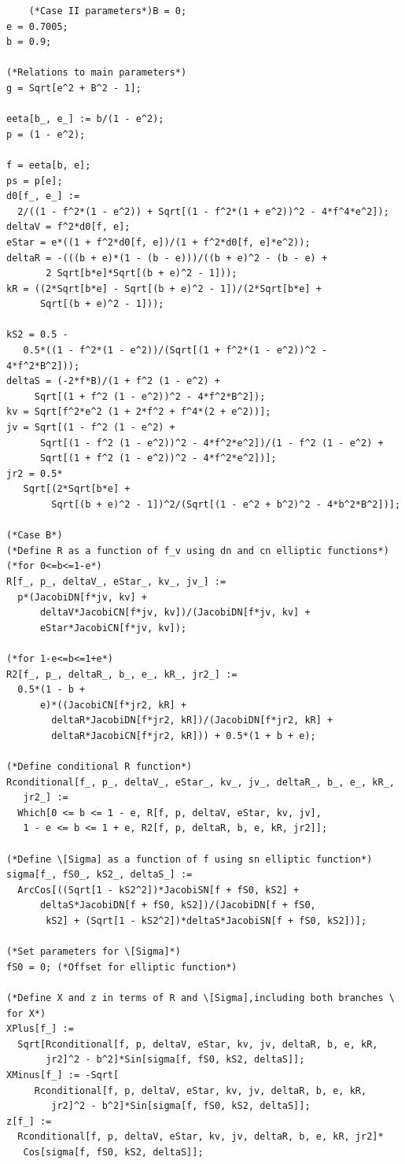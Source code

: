\documentclass[12pt,oneside]{report}
\theoremstyle{definition}
\begin{document}
\begin{verbatim}
    (*Case II parameters*)B = 0;
e = 0.7005;
b = 0.9;

(*Relations to main parameters*)
g = Sqrt[e^2 + B^2 - 1];

eeta[b_, e_] := b/(1 - e^2);
p = (1 - e^2);

f = eeta[b, e];
ps = p[e];
d0[f_, e_] := 
  2/((1 - f^2*(1 - e^2)) + Sqrt[(1 - f^2*(1 + e^2))^2 - 4*f^4*e^2]);
deltaV = f^2*d0[f, e];
eStar = e*((1 + f^2*d0[f, e])/(1 + f^2*d0[f, e]*e^2));
deltaR = -(((b + e)*(1 - (b - e)))/((b + e)^2 - (b - e) + 
       2 Sqrt[b*e]*Sqrt[(b + e)^2 - 1]));
kR = ((2*Sqrt[b*e] - Sqrt[(b + e)^2 - 1])/(2*Sqrt[b*e] + 
      Sqrt[(b + e)^2 - 1]));

kS2 = 0.5 - 
   0.5*((1 - f^2*(1 - e^2))/(Sqrt[(1 + f^2*(1 - e^2))^2 - 4*f^2*B^2]));
deltaS = (-2*f*B)/(1 + f^2 (1 - e^2) + 
     Sqrt[(1 + f^2 (1 - e^2))^2 - 4*f^2*B^2]);
kv = Sqrt[f^2*e^2 (1 + 2*f^2 + f^4*(2 + e^2))];
jv = Sqrt[(1 - f^2 (1 - e^2) + 
      Sqrt[(1 - f^2 (1 - e^2))^2 - 4*f^2*e^2])/(1 - f^2 (1 - e^2) + 
      Sqrt[(1 + f^2 (1 - e^2))^2 - 4*f^2*e^2])];
jr2 = 0.5*
   Sqrt[(2*Sqrt[b*e] + 
        Sqrt[(b + e)^2 - 1])^2/(Sqrt[(1 - e^2 + b^2)^2 - 4*b^2*B^2])];

(*Case B*)
(*Define R as a function of f_v using dn and cn elliptic functions*)
(*for 0<=b<=1-e*)
R[f_, p_, deltaV_, eStar_, kv_, jv_] := 
  p*(JacobiDN[f*jv, kv] + 
      deltaV*JacobiCN[f*jv, kv])/(JacobiDN[f*jv, kv] + 
      eStar*JacobiCN[f*jv, kv]);

(*for 1-e<=b<=1+e*)
R2[f_, p_, deltaR_, b_, e_, kR_, jr2_] := 
  0.5*(1 - b + 
      e)*((JacobiCN[f*jr2, kR] + 
        deltaR*JacobiDN[f*jr2, kR])/(JacobiDN[f*jr2, kR] + 
        deltaR*JacobiCN[f*jr2, kR])) + 0.5*(1 + b + e);

(*Define conditional R function*)
Rconditional[f_, p_, deltaV_, eStar_, kv_, jv_, deltaR_, b_, e_, kR_, 
   jr2_] := 
  Which[0 <= b <= 1 - e, R[f, p, deltaV, eStar, kv, jv], 
   1 - e <= b <= 1 + e, R2[f, p, deltaR, b, e, kR, jr2]];

(*Define \[Sigma] as a function of f using sn elliptic function*)
sigma[f_, fS0_, kS2_, deltaS_] := 
  ArcCos[((Sqrt[1 - kS2^2])*JacobiSN[f + fS0, kS2] + 
      deltaS*JacobiDN[f + fS0, kS2])/(JacobiDN[f + fS0, 
       kS2] + (Sqrt[1 - kS2^2])*deltaS*JacobiSN[f + fS0, kS2])];

(*Set parameters for \[Sigma]*)
fS0 = 0; (*Offset for elliptic function*)

(*Define X and z in terms of R and \[Sigma],including both branches \
for X*)
XPlus[f_] := 
  Sqrt[Rconditional[f, p, deltaV, eStar, kv, jv, deltaR, b, e, kR, 
       jr2]^2 - b^2]*Sin[sigma[f, fS0, kS2, deltaS]];
XMinus[f_] := -Sqrt[
     Rconditional[f, p, deltaV, eStar, kv, jv, deltaR, b, e, kR, 
        jr2]^2 - b^2]*Sin[sigma[f, fS0, kS2, deltaS]];
z[f_] := 
  Rconditional[f, p, deltaV, eStar, kv, jv, deltaR, b, e, kR, jr2]*
   Cos[sigma[f, fS0, kS2, deltaS]];


\end{verbatim}
\end{document}
